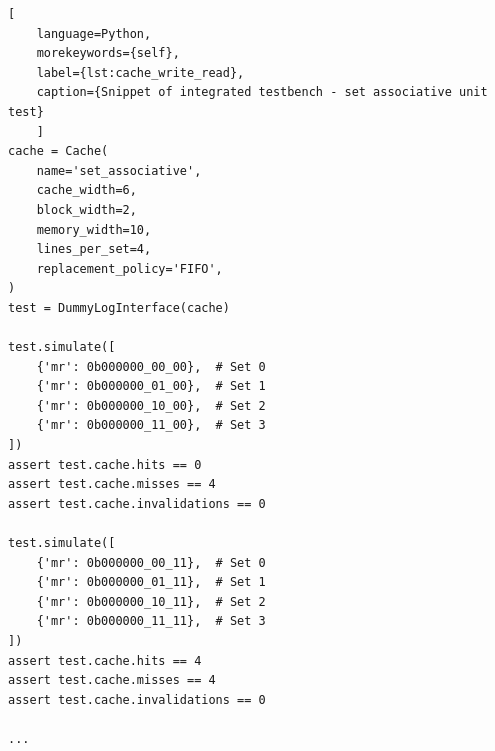 \begin{center}
\centering
\begin{minipage}{\linewidth}
\begin{lstlisting}[
    language=Python,
	morekeywords={self},
    label={lst:cache_write_read},
    caption={Snippet of integrated testbench - set associative unit test}
    ]
cache = Cache(
    name='set_associative',
    cache_width=6,
    block_width=2,
    memory_width=10,
    lines_per_set=4,
    replacement_policy='FIFO',
)
test = DummyLogInterface(cache)

test.simulate([
    {'mr': 0b000000_00_00},  # Set 0
    {'mr': 0b000000_01_00},  # Set 1
    {'mr': 0b000000_10_00},  # Set 2
    {'mr': 0b000000_11_00},  # Set 3
])
assert test.cache.hits == 0
assert test.cache.misses == 4
assert test.cache.invalidations == 0

test.simulate([
    {'mr': 0b000000_00_11},  # Set 0
    {'mr': 0b000000_01_11},  # Set 1
    {'mr': 0b000000_10_11},  # Set 2
    {'mr': 0b000000_11_11},  # Set 3
])
assert test.cache.hits == 4
assert test.cache.misses == 4
assert test.cache.invalidations == 0

...
\end{lstlisting}
\end{minipage}
\end{center}

